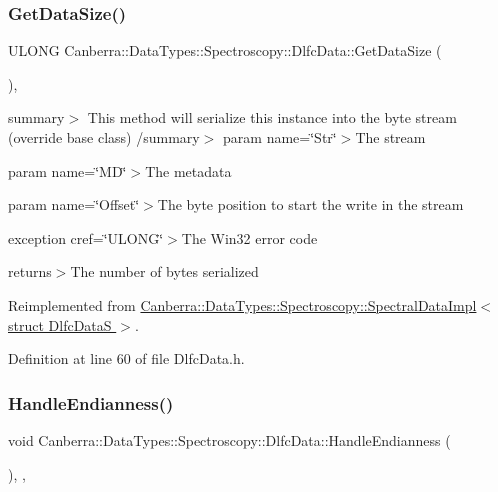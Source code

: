 \subsubsection{\texorpdfstring{Get\+Data\+Size()}{GetDataSize()}}
{\footnotesize\ttfamily U\+L\+O\+NG Canberra\+::\+Data\+Types\+::\+Spectroscopy\+::\+Dlfc\+Data\+::\+Get\+Data\+Size (\begin{DoxyParamCaption}{ }\end{DoxyParamCaption})\hspace{0.3cm}{\ttfamily [inline]}, {\ttfamily [virtual]}}

summary$>$ This method will serialize this instance into the byte stream (override base class) /summary$>$ param name=\char`\"{}\+Str\char`\"{}$>$The stream

param name=\char`\"{}\+M\+D\char`\"{}$>$The metadata

param name=\char`\"{}\+Offset\char`\"{}$>$The byte position to start the write in the stream

exception cref=\char`\"{}\+U\+L\+O\+N\+G\char`\"{}$>$The Win32 error code

returns$>$The number of bytes serialized

Reimplemented from \hyperlink{class_canberra_1_1_data_types_1_1_spectroscopy_1_1_spectral_data_impl_aa681684f88b9e64aa2b8208f4525863d_aa681684f88b9e64aa2b8208f4525863d}{Canberra\+::\+Data\+Types\+::\+Spectroscopy\+::\+Spectral\+Data\+Impl$<$ struct Dlfc\+Data\+S $>$}.



Definition at line 60 of file Dlfc\+Data.\+h.

\mbox{\label{class_canberra_1_1_data_types_1_1_spectroscopy_1_1_dlfc_data_a90ac0d4fa457c81423ab25b9089dfa83_a90ac0d4fa457c81423ab25b9089dfa83}} 
\subsubsection{\texorpdfstring{Handle\+Endianness()}{HandleEndianness()}}
{\footnotesize\ttfamily void Canberra\+::\+Data\+Types\+::\+Spectroscopy\+::\+Dlfc\+Data\+::\+Handle\+Endianness (\begin{DoxyParamCaption}{ }\end{DoxyParamCaption})\hspace{0.3cm}{\ttfamily [inline]}, {\ttfamily [protected]}, {\ttfamily [virtual]}}

